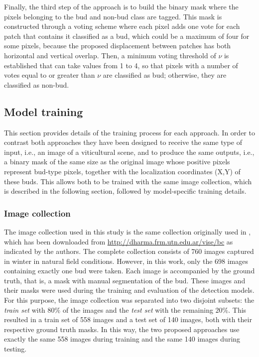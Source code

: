 \documentclass[a4paper,authoryear,review]{elsarticle}
\begin{document}
	Finally, the third step of the approach is to build the binary mask where the pixels belonging to the bud and non-bud class are tagged. This mask is constructed through a voting scheme where each pixel adds one vote for each patch that contains it classified as a bud, which could be a maximum of four for some pixels, because the proposed displacement between patches has both horizontal and vertical overlap. Then, a minimum voting threshold of $\nu$ is established that can take values from 1 to 4, so that pixels with a number of votes equal to or greater than $\nu$ are classified as bud; otherwise, they are classified as non-bud. 
	
	\subsection{Model training}
	\label{sec:train}
	
	This section provides details of the training process for each approach. In order to contrast both approaches they have been designed to receive the same type of input, i.e., an image of a viticultural scene, and to produce the same outputs, i.e., a binary mask of the same size as the original image whose positive pixels represent bud-type pixels, together with the  localization coordinates (X,Y) of these buds. This allows both to be trained with the same image collection, which is described in the following section, followed by model-specific training details.
	
	\subsubsection{Image collection}
	\label{sec:collection}
	
	The image collection used in this study is the same collection originally used in \citet{perez2017image}, which has been downloaded from \url{
		http://dharma.frm.utn.edu.ar/vise/bc} as indicated by the authors. The complete collection consists of 760 images captured in winter in natural field conditions. However, in this work, only the 698 images containing exactly one bud were taken. Each image is accompanied by the ground truth, that is, a mask with manual segmentation of the bud. These images and their masks were used during the training and evaluation of the detection models. For this purpose, the image collection was separated into two disjoint subsets: the \emph{train set} with $80\%$ of the images and the \emph{test set} with the remaining  $20\%$. This resulted in a train set of 558 images and a test set of 140 images, both with their respective ground truth masks. In this way, the two proposed approaches use exactly the same 558 images during training and the same 140 images during testing.
	
\end{document}
